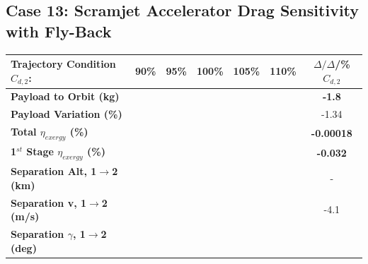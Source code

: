 \subsection{Case 13: Scramjet Accelerator Drag Sensitivity with Fly-Back}\label{sec:dragvar}


\begin{table}[ht]%
	\centering
	\begin{tabular}{l c c c c c c} 
		\hline \textbf{Trajectory Condition}   \qquad  $C_{d,2}$:
		&90\%
		&95\%
		&100\%
		&105\%
		&110\%
		& $\Delta/\Delta$/\%$C_{d,2}$
		\\
		\hline \textbf{Payload to Orbit (kg)}
		& \textbf{\PayloadToOrbitCdNinety}
		& \textbf{\PayloadToOrbitCdNinetyFive}
		& \textbf{\PayloadToOrbitCdStandard}
		& \textbf{\PayloadToOrbitCdOneHundredFive}
		& \textbf{\PayloadToOrbitCdOneHundredTen}
		&\textbf{-1.8}
		\\
		\textbf{Payload Variation (\%)}
		& \PayloadVarCdNinety
		& \PayloadVarCdNinetyFive
		& \PayloadVarCdStandard
		& \PayloadVarCdOneHundredFive
		& \PayloadVarCdOneHundredTen
		&-1.34
		\\
		\textbf{Total $\eta_{exergy}$ (\%)}
		& \textbf{\totalExergyEffCdNinety}
		& \textbf{\totalExergyEffCdNinetyFive}
		& \textbf{\totalExergyEffCdStandard}
		& \textbf{\totalExergyEffCdOneHundredFive}
		& \textbf{\totalExergyEffCdOneHundredTen}
		& \textbf{-0.00018}
		\\
		\hline 
		\textbf{1$^{st}$ Stage $\eta_{exergy}$ (\%)}
		& \textbf{\firstExergyEffCdNinety}
		& \textbf{\firstExergyEffCdNinetyFive}
		& \textbf{\firstExergyEffCdStandard}
		& \textbf{\firstExergyEffCdOneHundredFive}
		& \textbf{\firstExergyEffCdOneHundredTen}
		& \textbf{-0.032}
		\\
		\textbf{Separation Alt, 1$\rightarrow$2 (km)}
		& \firstsecondSeparationAltCdNinety
		& \firstsecondSeparationAltCdNinetyFive
		& \firstsecondSeparationAltCdStandard
		& \firstsecondSeparationAltCdOneHundredFive
		& \firstsecondSeparationAltCdOneHundredTen
		& -
		\\
		\textbf{Separation v, 1$\rightarrow$2 (m/s)}
		& \firstsecondSeparationvCdNinety
		& \firstsecondSeparationvCdNinetyFive
		& \firstsecondSeparationvCdStandard
		& \firstsecondSeparationvCdOneHundredFive
		& \firstsecondSeparationvCdOneHundredTen
		&-4.1
		\\
		\textbf{Separation $\gamma$, 1$\rightarrow$2 (deg)}
		& \firstsecondSeparationgammaCdNinety
		& \firstsecondSeparationgammaCdNinetyFive
		& \firstsecondSeparationgammaCdStandard

\end{tabular}
\end{table}
